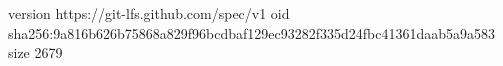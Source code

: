 version https://git-lfs.github.com/spec/v1
oid sha256:9a816b626b75868a829f96bcdbaf129ec93282f335d24fbc41361daab5a9a583
size 2679
